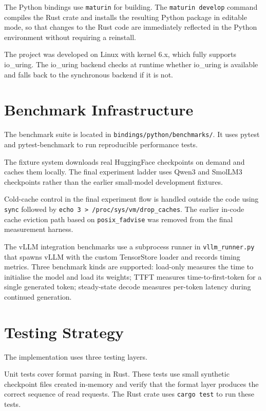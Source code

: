 The Python bindings use \texttt{maturin} for building. The \texttt{maturin develop} command compiles the Rust crate and installs the resulting Python package in editable mode, so that changes to the Rust code are immediately reflected in the Python environment without requiring a reinstall.

The project was developed on Linux with kernel 6.x, which fully supports io\_uring. The io\_uring backend checks at runtime whether io\_uring is available and falls back to the synchronous backend if it is not.

\section{Benchmark Infrastructure}

The benchmark suite is located in \texttt{bindings/python/benchmarks/}. It uses pytest and pytest-benchmark to run reproducible performance tests.

The fixture system downloads real HuggingFace checkpoints on demand and caches them locally. The final experiment ladder uses Qwen3 and SmolLM3 checkpoints rather than the earlier small-model development fixtures.

Cold-cache control in the final experiment flow is handled outside the code using \texttt{sync} followed by \texttt{echo 3 > /proc/sys/vm/drop\_caches}. The earlier in-code cache eviction path based on \texttt{posix\_fadvise} was removed from the final measurement harness.

The vLLM integration benchmarks use a subprocess runner in \texttt{vllm\_runner.py} that spawns vLLM with the custom TensorStore loader and records timing metrics. Three benchmark kinds are supported: load-only measures the time to initialise the model and load its weights; TTFT measures time-to-first-token for a single generated token; steady-state decode measures per-token latency during continued generation.

\section{Testing Strategy}

The implementation uses three testing layers.

Unit tests cover format parsing in Rust. These tests use small synthetic checkpoint files created in-memory and verify that the format layer produces the correct sequence of read requests. The Rust crate uses \texttt{cargo test} to run these tests.


